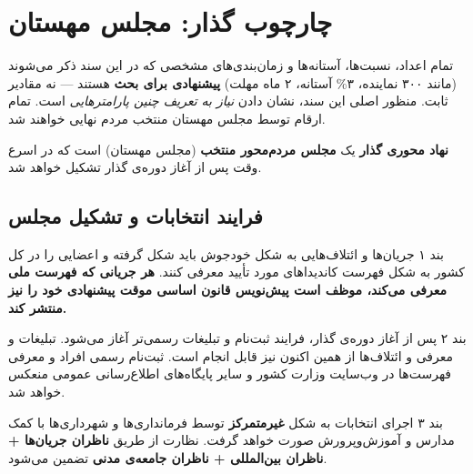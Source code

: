 \chapter{چارچوب گذار: مجلس مهستان}
\label{ch:mahestan}

\begin{notebox}[title={\rl{یادداشت مهم درباره‌ی اعداد و نسبت‌های این سند}}]
	تمام اعداد، نسبت‌ها، آستانه‌ها و زمان‌بندی‌های مشخصی که در این سند ذکر می‌شوند
	(مانند ۳۰۰ نماینده، ۳\% آستانه، ۲ ماه مهلت) \textbf{پیشنهادی برای بحث} هستند ---
	نه مقادیر ثابت. منظور اصلی این سند، نشان دادن \emph{نیاز به تعریف چنین پارامترهایی}
	است. تمام ارقام توسط مجلس مهستان منتخب مردم نهایی خواهند شد.
\end{notebox}

\textbf{نهاد محوری گذار} یک \textbf{مجلس مردم‌محور منتخب} (مجلس مهستان) است که
در اسرع وقت پس از آغاز دوره‌ی گذار تشکیل خواهد شد.

\section{فرایند انتخابات و تشکیل مجلس}

\begin{bandbox}{بند ۱}
	جریان‌ها و ائتلاف‌هایی به شکل خودجوش باید شکل گرفته و اعضایی را در کل کشور به شکل
	فهرست کاندیداهای مورد تأیید معرفی کنند. \textbf{هر جریانی که فهرست ملی معرفی می‌کند،
		موظف است پیش‌نویس قانون اساسی موقت پیشنهادی خود را نیز منتشر کند.}
\end{bandbox}

\begin{bandbox}{بند ۲}
	پس از آغاز دوره‌ی گذار، فرایند ثبت‌نام و تبلیغات رسمی‌تر آغاز می‌شود. تبلیغات و معرفی
	و ائتلاف‌ها از همین اکنون نیز قابل انجام است. ثبت‌نام رسمی افراد و معرفی فهرست‌ها در
	وب‌سایت وزارت کشور و سایر پایگاه‌های اطلاع‌رسانی عمومی منعکس خواهد شد.
\end{bandbox}

\begin{bandbox}{بند ۳}
	اجرای انتخابات به شکل \textbf{غیرمتمرکز} توسط فرمانداری‌ها و شهرداری‌ها با کمک
	مدارس و آموزش‌وپرورش صورت خواهد گرفت. نظارت از طریق \textbf{ناظران جریان‌ها + ناظران
		بین‌المللی + ناظران جامعه‌ی مدنی} تضمین می‌شود.
\end{bandbox}

